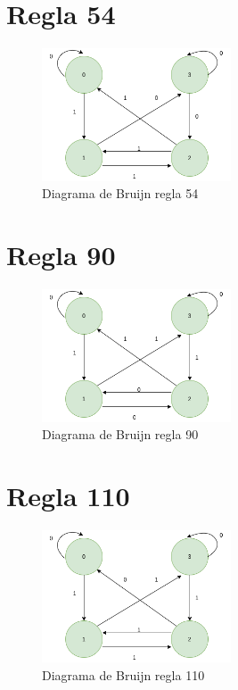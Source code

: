 \section{Regla 54}


\begin{figure}[h]
	\centering
	\includegraphics[width=0.5\textwidth]{capitulo1/images/rule54.png}
	\caption{Diagrama de Bruijn regla 54}
	\label{fig:rule54}
\end{figure}
\section{Regla 90}


\begin{figure}[h]
	\centering
	\includegraphics[width=0.5\textwidth]{capitulo1/images/rule90.png}
	\caption{Diagrama de Bruijn regla 90}
	\label{fig:rule90}
\end{figure}


\section{Regla 110}



\begin{figure}[h]
	\centering
	\includegraphics[width=0.5\textwidth]{capitulo1/images/rule110.png}
	\caption{Diagrama de Bruijn regla 110}
	\label{fig:rule110}
\end{figure}